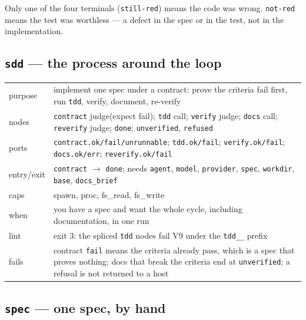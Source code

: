 Only one of the four terminals (\texttt{still-red}) means the code was wrong.
\texttt{not-red} means the test was worthless --- a defect in the spec or in the test, not in
the implementation.

\subsection*{\texttt{sdd} --- the process around the loop}

\begin{center}\footnotesize
\begin{tabular}{@{}>{\raggedright\arraybackslash}p{}>{\raggedright\arraybackslash}p{}@{}}
  purpose & implement one spec under a contract: prove the criteria fail first, run
    \texttt{tdd}, verify, document, re-verify \\
  nodes & \texttt{contract} judge(expect fail); \texttt{tdd} call; \texttt{verify} judge;
    \texttt{docs} call; \texttt{reverify} judge; \texttt{done}; \texttt{unverified},
    \texttt{refused} \\
  ports & \texttt{contract.ok/fail/unrunnable}; \texttt{tdd.ok/fail}; \texttt{verify.ok/fail};
    \texttt{docs.ok/err}; \texttt{reverify.ok/fail} \\
  entry/exit & \texttt{contract} $\to$ \texttt{done}; needs \texttt{agent}, \texttt{model},
    \texttt{provider}, \texttt{spec}, \texttt{workdir}, \texttt{base}, \texttt{docs\_brief} \\
  caps & spawn, proc, fs\_read, fs\_write \\
  when & you have a spec and want the whole cycle, including documentation, in one run \\
  lint & exit 3: the spliced \texttt{tdd} nodes fail V9 under the \texttt{tdd\_\_} prefix \\
  fails & contract \texttt{fail} means the criteria already pass, which is a spec that proves
    nothing; docs that break the criteria end at \texttt{unverified}; a refusal is not
    returned to a host \\
\end{tabular}
\end{center}

\subsection*{\texttt{spec} --- one spec, by hand}

